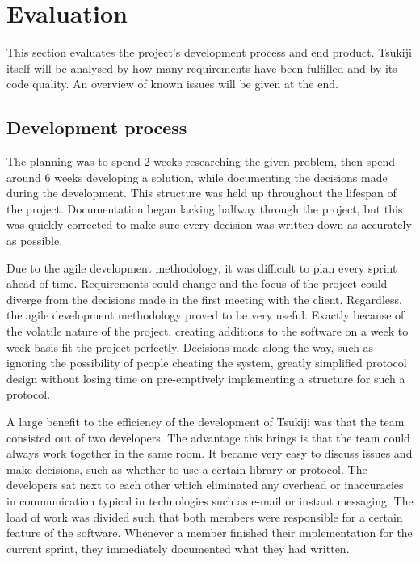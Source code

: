 \section{Evaluation}
\label{evaluation}
This section evaluates the project's development process and end product.
Tsukiji itself will be analysed by how many requirements have been fulfilled and by its code quality.
An overview of known issues will be given at the end.

\subsection{Development process}
The planning was to spend 2 weeks researching the given problem, then spend around 6 weeks developing a solution, while documenting the decisions made during the development.
This structure was held up throughout the lifespan of the project.
Documentation began lacking halfway through the project, but this was quickly corrected to make sure every decision was written down as accurately as possible.

Due to the agile development methodology, it was difficult to plan every sprint ahead of time.
Requirements could change and the focus of the project could diverge from the decisions made in the first meeting with the client.
Regardless, the agile development methodology proved to be very useful.
Exactly because of the volatile nature of the project, creating additions to the software on a week to week basis fit the project perfectly. 
Decisions made along the way, such as ignoring the possibility of people cheating the system, greatly simplified protocol design without losing time on pre-emptively implementing a structure for such a protocol.

A large benefit to the efficiency of the development of Tsukiji was that the team consisted out of two developers.
The advantage this brings is that the team could always work together in the same room.
It became very easy to discuss issues and make decisions, such as whether to use a certain library or protocol.
The developers sat next to each other which eliminated any overhead or inaccuracies in communication typical in technologies such as e-mail or instant messaging.
The load of work was divided such that both members were responsible for a certain feature of the software.
Whenever a member finished their implementation for the current sprint, they immediately documented what they had written.

